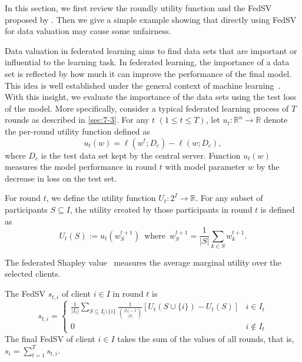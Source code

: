 In this section, we first review the roundly utility function and the FedSV proposed by \citet{wang2020principled}. Then we give a simple example showing that directly using FedSV for data valuation may cause some unfairness. 

Data valuation in federated learning aims to find data sets that are important or influential to the learning task. In federated learning, the importance of a data set is reflected by how much it can improve the performance of the final model. This idea is well established under the general context of machine learning~\citep{ghorbani2019data}. With this insight, we evaluate the importance of the data sets using the test loss of the model. More specifically, consider a typical federated learning process of $T$ rounds as described in \autoref{sec:7-3}. For any $t$ $(1 \leq t \leq T)$, let $u_t: \mathbb{R}^n \to \mathbb{R}$ denote the per-round utility function defined as
\begin{equation} \label{eq:utility}
    u_t(w) = \ell(w^t; D_c) - \ell(w; D_c),
\end{equation}
where $D_c$ is the test data set kept by the central server. Function $u_t(w)$ measures the model performance in round $t$ with model parameter $w$ by the decrease in loss on the test set. 

For round $t $, we define the utility function $U_t : 2^{I} \to \mathbb{R}$. For any subset of participants $S \subseteq I$, the utility created by those participants in round $t$ is defined as
\[U_t(S) := u_t(w_S^{t+1})  \enspace\text{where}\enspace w_S^{t+1} = \frac{1}{|S|}\sum_{k\in S} w_k^{t+1}.\]

The federated Shapley value~\citep{wang2020principled} measures the average marginal utility over the selected clients. 
\begin{definition} \label{def:federated_sv}
    The FedSV $s_{t, i}$ of client $i \in I$ in round $t$ is 
    \begin{equation*}
    s_{t, i} = 
        \begin{cases} 
      \frac{1}{|I_t|} \sum\limits_{S \subseteq I_t \setminus\{i\}} \frac{1}{\binom{|I_t|-1}{|S|}} \left[U_t(S\cup\{i\}) - U_t(S)\right] & i \in I_t \\
      0 & i \notin I_t 
   \end{cases}
    \end{equation*}
    The final FedSV of client $i \in I$ takes the sum of the values of all rounds, that is, 
   $s_i = \sum_{t=1}^T s_{t, i}$.
\end{definition}


